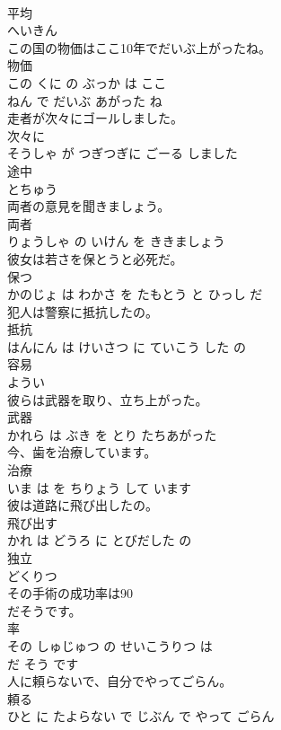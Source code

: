 \documentclass[8pt]{extreport}
\begin{document}
\begin{CJK}{UTF8}{min}
\\	平均	
\\	へいきん		
\\	この国の物価はここ10年でだいぶ上がったね。	
\\	物価 
\\	この くに の ぶっか は ここ 
\\	ねん で だいぶ あがった ね			
\\	走者が次々にゴールしました。	
\\	次々に 
\\	そうしゃ が つぎつぎに ごーる しました			
\\	途中	
\\	とちゅう		
\\	両者の意見を聞きましょう。	
\\	両者 
\\	りょうしゃ の いけん を ききましょう			
\\	彼女は若さを保とうと必死だ。	
\\	保つ 
\\	かのじょ は わかさ を たもとう と ひっし だ			
\\	犯人は警察に抵抗したの。	
\\	抵抗 
\\	はんにん は けいさつ に ていこう した の			
\\	容易	
\\	ようい		
\\	彼らは武器を取り、立ち上がった。	
\\	武器 
\\	かれら は ぶき を とり たちあがった			
\\	今、歯を治療しています。	
\\	治療 
\\	いま は を ちりょう して います			
\\	彼は道路に飛び出したの。	
\\	飛び出す 
\\	かれ は どうろ に とびだした の			
\\	独立	
\\	どくりつ		
\\	その手術の成功率は90
\\	だそうです。	
\\	率 
\\	その しゅじゅつ の せいこうりつ は 
\\	だ そう です			
\\	人に頼らないで、自分でやってごらん。	
\\	頼る 
\\	ひと に たよらない で じぶん で やって ごらん			

\end{CJK}
\end{document}
